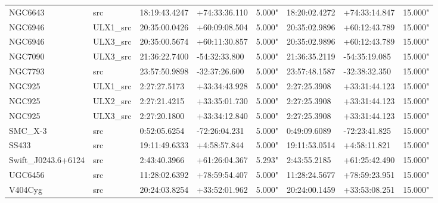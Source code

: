\begin{tabular}{llllllll}
           NGC6643 &         src & 18:19:43.4247 & +74:33:36.110 &     5.000" & 18:20:02.4272 & +74:33:14.847 &    15.000" \\
           NGC6946 &    ULX1\_src & 20:35:00.0426 & +60:09:08.504 &     5.000" & 20:35:02.9896 & +60:12:43.789 &    15.000" \\
           NGC6946 &    ULX3\_src & 20:35:00.5674 & +60:11:30.857 &     5.000" & 20:35:02.9896 & +60:12:43.789 &    15.000" \\
           NGC7090 &    ULX3\_src & 21:36:22.7400 & -54:32:33.800 &     5.000" & 21:36:35.2119 & -54:35:19.085 &    15.000" \\
           NGC7793 &         src & 23:57:50.9898 & -32:37:26.600 &     5.000" & 23:57:48.1587 & -32:38:32.350 &    15.000" \\
            NGC925 &    ULX1\_src &  2:27:27.5173 & +33:34:43.928 &     5.000" &  2:27:25.3908 & +33:31:44.123 &    15.000" \\
            NGC925 &    ULX2\_src &  2:27:21.4215 & +33:35:01.730 &     5.000" &  2:27:25.3908 & +33:31:44.123 &    15.000" \\
            NGC925 &    ULX3\_src &  2:27:20.1800 & +33:34:12.840 &     5.000" &  2:27:25.3908 & +33:31:44.123 &    15.000" \\
           SMC\_X-3 &         src &  0:52:05.6254 & -72:26:04.231 &     5.000" &  0:49:09.6089 & -72:23:41.825 &    15.000" \\
             SS433 &         src & 19:11:49.6333 &  +4:58:57.844 &     5.000" & 19:11:53.0514 &  +4:58:11.821 &    15.000" \\
Swift\_J0243.6+6124 &         src &  2:43:40.3966 & +61:26:04.367 &     5.293" &  2:43:55.2185 & +61:25:42.490 &    15.000" \\
           UGC6456 &         src & 11:28:02.6392 & +78:59:54.407 &     5.000" & 11:28:24.5677 & +78:59:23.951 &    15.000" \\
           V404Cyg &         src & 20:24:03.8254 & +33:52:01.962 &     5.000" & 20:24:00.1459 & +33:53:08.251 &    15.000" \\
\bottomrule
\end{tabular}
